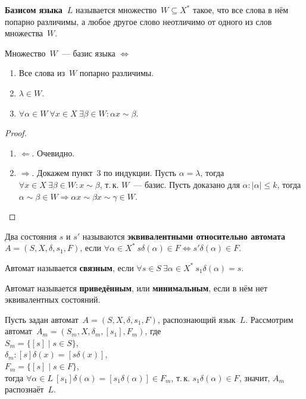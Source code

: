  \textbf{Базисом языка~$L$} называется множество~$W \subseteq X^*$ такое, что все слова в нём попарно различимы, а любое другое слово неотличимо от одного из слов множества~$W$.

\begin{theorem}
Множество~$W$~--- базис языка $\Leftrightarrow$
\begin{enumerate}
	\item Все слова из~$W$ попарно различимы.
	\item $\lambda \in W$.
	\item $\forall \alpha \in W \ \forall x \in X \ \exists \beta \in W \colon \alpha x \sim \beta$.
\end{enumerate}
\end{theorem}
\begin{proof}
\begin{enumerate}
	\item $\Leftarrow$. Очевидно.
	\item $\Rightarrow$. Докажем пункт~3 по индукции.
		\indbase Пусть $\alpha = \lambda$, тогда $\forall x \in X \ \exists \beta \in W \colon x \sim \beta$, т.\,к. $W$~--- базис.
		\indstep Пусть доказано для $\alpha \colon |\alpha| \leqslant k$, тогда $\alpha \sim \beta \in W \Rightarrow \alpha x \sim \beta x \sim \gamma \in W$.
		\indend
\end{enumerate}
\end{proof}

Два состояния $s$ и $s'$ называются \textbf{эквивалентными относительно автомата~$A = (S, X, \delta, s_1, F)$}, если $\forall \alpha \in X^* \ \allowbreak s \delta(\alpha) \in F \Leftrightarrow s' \delta(\alpha) \in F$.

 Автомат называется \textbf{связным}, если $\forall s \in S \ \exists \alpha \in X^* \ s_1 \delta(\alpha) = s$.

  Автомат называется \textbf{приведённым}, или \textbf{минимальным}, если в нём нет эквивалентных состояний.

Пусть задан автомат~$A = (S, X, \delta, s_1, F)$, распознающий язык~$L$.
Рассмотрим автомат~$A_m = (S_m, X, \delta_m, [s_1], F_m)$, где\\
$S_m = \{ [s] \mid s \in S \}$,\\
$\delta_m \colon [s] \delta(x) = [s \delta(x)]$,\\
$F_m = \{ [s] \mid s \in F \}$,\\
тогда $\forall \alpha \in L \ [s_1] \delta(\alpha) = [s_1 \delta(\alpha)] \in F_m$, т.\,к. $s_1 \delta(\alpha) \in F$, значит, $A_m$ распознаёт~$L$.

